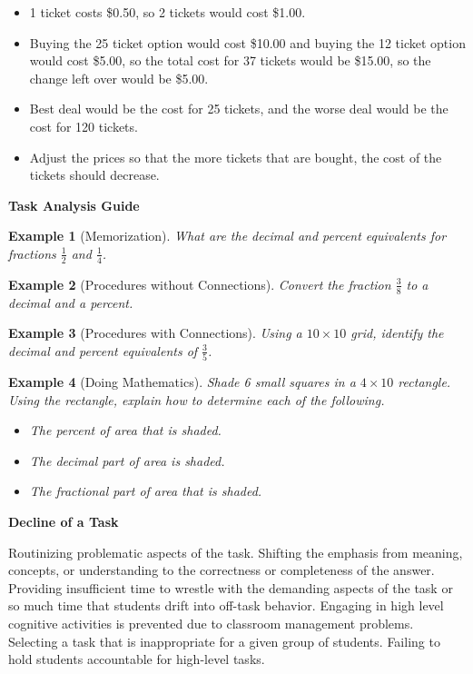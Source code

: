 \documentclass[11pt]{article}
\theoremstyle{theorem}\newtheorem*{task}{Task}
\theoremstyle{theorem}\newtheorem*{example}{Example}
\theoremstyle{definition}\newtheorem*{solution}{Solution}
\theoremstyle{theorem}\newtheorem*{prompt}{Prompt}
\begin{document}
\begin{itemize}
    \item[(a)] 1 ticket costs \$0.50, so 2 tickets would cost \$1.00.
    \item[(b)] Buying the 25 ticket option would cost \$10.00 and buying the 12 ticket option would cost \$5.00, so the total cost for 37 tickets would be \$15.00, so the change left over would be \$5.00.
    \item[(c)] Best deal would be the cost for 25 tickets, and the worse deal would be the cost for 120 tickets.
    \item[(d)] Adjust the prices so that the more tickets that are bought, the cost of the tickets should decrease.
\end{itemize}

\noindent \textbf{Task Analysis Guide}

\begin{example}[Memorization]
    What are the decimal and percent equivalents for fractions $\frac{1}{2}$ and $\frac{1}{4}$.
\end{example}

\begin{example}[Procedures without Connections]
    Convert the fraction $\frac{3}{8}$ to a decimal and a percent.
\end{example}

\begin{example}[Procedures with Connections]
    Using a $10 \times 10$ grid, identify the decimal and percent equivalents of $\frac{3}{5}$.
\end{example}

\begin{example}[Doing Mathematics]
    Shade 6 small squares in a $4 \times 10$ rectangle. Using the rectangle, explain how to determine each of the following.
    \begin{itemize}
        \item[(a)] The percent of area that is shaded.
        \item[(b)] The decimal part of area is shaded.
        \item[(c)] The fractional part of area that is shaded.
    \end{itemize}
\end{example}

\noindent \textbf{Decline of a Task}

Routinizing problematic aspects of the task. Shifting the emphasis from meaning, concepts, or understanding to the correctness or completeness of the answer. Providing insufficient time to wrestle with the demanding aspects of the task or so much time that students drift into off-task behavior. Engaging in high level cognitive activities is prevented due to classroom management problems. Selecting a task that is inappropriate for a given group of students. Failing to hold students accountable for high-level tasks.
\end{document}
